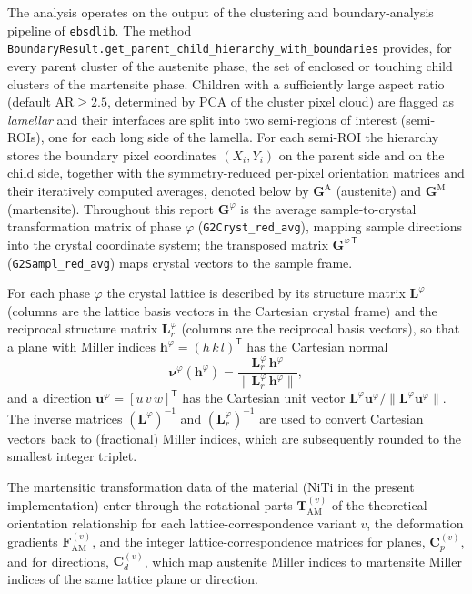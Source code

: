 \documentclass[11pt,a4paper]{article}
\newcommand{\mat}[1]{\mathbf{#1}}
\newcommand{\vc}[1]{\bm{#1}}
\begin{document}
The analysis operates on the output of the clustering and boundary-analysis pipeline of \texttt{ebsdlib}. The method \texttt{BoundaryResult.get\_parent\_child\_hierarchy\_with\_boundaries} provides, for every parent cluster of the austenite phase, the set of enclosed or touching child clusters of the martensite phase. Children with a sufficiently large aspect ratio (default $\mathrm{AR}\geq 2.5$, determined by PCA of the cluster pixel cloud) are flagged as \emph{lamellar} and their interfaces are split into two semi-regions of interest (semi-ROIs), one for each long side of the lamella. For each semi-ROI the hierarchy stores the boundary pixel coordinates $(X_i,Y_i)$ on the parent side and on the child side, together with the symmetry-reduced per-pixel orientation matrices and their iteratively computed averages, denoted below by $\mat{G}^{\mathrm{A}}$ (austenite) and $\mat{G}^{\mathrm{M}}$ (martensite). Throughout this report $\mat{G}^{\varphi}$ is the average sample-to-crystal transformation matrix of phase $\varphi$ (\texttt{G2Cryst\_red\_avg}), mapping sample directions into the crystal coordinate system; the transposed matrix $\mat{G}^{\varphi\,\mathsf{T}}$ (\texttt{G2Sampl\_red\_avg}) maps crystal vectors to the sample frame.

For each phase $\varphi$ the crystal lattice is described by its structure matrix $\mat{L}^{\varphi}$ (columns are the lattice basis vectors in the Cartesian crystal frame) and the reciprocal structure matrix $\mat{L}_{r}^{\varphi}$ (columns are the reciprocal basis vectors), so that a plane with Miller indices $\vc{h}^{\varphi}=(h\,k\,l)^{\mathsf T}$ has the Cartesian normal
\begin{equation}
\vc{\nu}^{\varphi}(\vc h^{\varphi})=\frac{\mat{L}_{r}^{\varphi}\,\vc h^{\varphi}}{\lVert \mat{L}_{r}^{\varphi}\,\vc h^{\varphi}\rVert},
\label{eq:nu}
\end{equation}
and a direction $\vc{u}^{\varphi}=[u\,v\,w]^{\mathsf T}$ has the Cartesian unit vector $\mat{L}^{\varphi}\vc u^{\varphi}/\lVert\mat{L}^{\varphi}\vc u^{\varphi}\rVert$. The inverse matrices $(\mat{L}^{\varphi})^{-1}$ and $(\mat{L}_{r}^{\varphi})^{-1}$ are used to convert Cartesian vectors back to (fractional) Miller indices, which are subsequently rounded to the smallest integer triplet.

The martensitic transformation data of the material (NiTi in the present implementation) enter through the rotational parts $\mat{T}^{(v)}_{\mathrm{AM}}$ of the theoretical orientation relationship for each lattice-correspondence variant $v$, the deformation gradients $\mat{F}^{(v)}_{\mathrm{AM}}$, and the integer lattice-correspondence matrices for planes, $\mat{C}_p^{(v)}$, and for directions, $\mat{C}_d^{(v)}$, which map austenite Miller indices to martensite Miller indices of the same lattice plane or direction.
\end{document}

